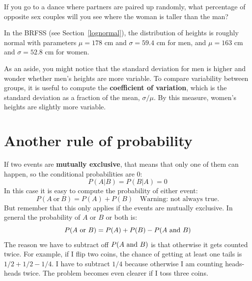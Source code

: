 \documentclass[12pt]{book}
\begin{document}
\begin{ex}
\label{coef_var}


If you go to a dance where partners are paired up randomly, what
percentage of opposite sex couples will you see where the woman is
taller than the man?


In the BRFSS (see Section~\ref{lognormal}), the distribution of
heights is roughly normal with parameters $\mu=178$ cm and
$\sigma=59.4$ cm for men, and $\mu=163$ cm and $\sigma=52.8$ cm for
women.



As an aside, you might notice that the standard deviation for men is
higher and wonder whether men's heights are more variable.  To compare
variability between groups, it is useful to compute the {\bf
  coefficient of variation}, which is the standard deviation as a
fraction of the mean, $\sigma / \mu$.  By this measure, women's
heights are slightly more variable.



\end{ex}

\section{Another rule of probability}

\newcommand{\OR}{~\mbox{or}~}
\newcommand{\NOT}{~\mbox{not}~}

If two events are {\bf mutually exclusive}, that means that only
one of them can happen, so the conditional probabilities are 0:
%
\[ P(A|B) = P(B|A) = 0 \]
%
In this case it is easy to compute the probability of either event:
%
\[ P(A \OR B) = P(A) + P(B)   \quad \mbox{Warning: not always true.} \]
%
But remember that this only applies if the events are mutually
exclusive.  In general the probability of $A$ or $B$ or both is:
%
\[ P(A \OR B) = P(A) + P(B) - P(A \AND B) \]
%
The reason we have to subtract off $P(A ~\mbox{and}~ B)$ is that otherwise it
gets counted twice.  For example, if I flip two coins, the chance of
getting at least one tails is $1/2 + 1/2 - 1/4$.  I have to subtract
$1/4$ because otherwise I am counting heads-heads twice.  The problem
becomes even clearer if I toss three coins.
\end{document}
